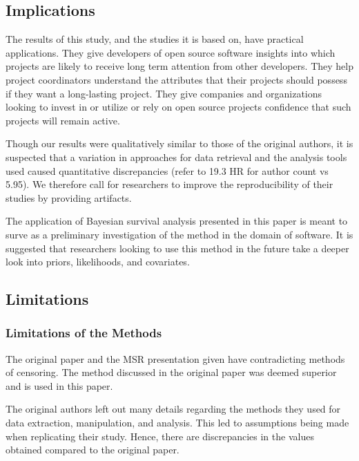 \documentclass[acmconf]{acmart}
\begin{document}
\subsection{Implications} \label{implications}

The results of this study, and the studies it is based on, have practical applications.
They give developers of open source software insights into which projects are likely to receive long term attention from other developers.
They help project coordinators understand the attributes that their projects should possess if they want a long-lasting project.
They give companies and organizations looking to invest in or utilize or rely on open source projects confidence that such projects will remain active.

Though our results were qualitatively similar to those of the original authors, it is suspected that a variation in approaches for data retrieval and the analysis tools used caused quantitative discrepancies (refer to 19.3 HR for author count vs 5.95).
We therefore call for researchers to improve the reproducibility of their studies by providing artifacts.


The application of Bayesian survival analysis presented in this paper is meant to surve as a preliminary investigation of the method in the domain of software.
It is suggested that researchers looking to use this method in the future take a deeper look into priors, likelihoods, and covariates.

\subsection{Limitations} \label{limit}

\subsubsection{Limitations of the Methods} \label{limit-methods}

The original paper \cite{ali2020cheating} and the MSR presentation given \cite{ali2020video} have contradicting methods of censoring.
The method discussed in the original paper was deemed superior and is used in this paper.

The original authors left out many details regarding the methods they used for data extraction, manipulation, and analysis.
This led to assumptions being made when replicating their study.
Hence, there are discrepancies in the values obtained compared to the original paper.
\end{document}
